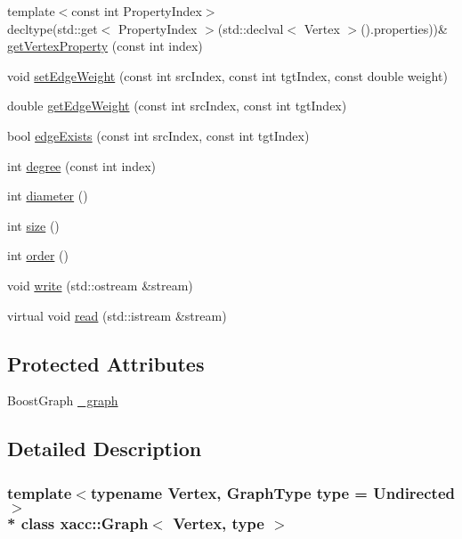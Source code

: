 \begin{DoxyCompactItemize}
\item 
{\footnotesize template$<$const int Property\+Index$>$ }\\decltype(std\+::get$<$ Property\+Index $>$(std\+::declval$<$ Vertex $>$().properties))\& \hyperlink{a00035_a394f58c21a234393f08b4c3a565a5940}{get\+Vertex\+Property} (const int index)
\item 
void \hyperlink{a00035_aaf1edd0f038f6cca1c3c9ece35d3ec05}{set\+Edge\+Weight} (const int src\+Index, const int tgt\+Index, const double weight)
\item 
double \hyperlink{a00035_a917e439598a91ace852ad67bba029f5c}{get\+Edge\+Weight} (const int src\+Index, const int tgt\+Index)
\item 
bool \hyperlink{a00035_acb5a6e586e58dbef53d84631134a1cdf}{edge\+Exists} (const int src\+Index, const int tgt\+Index)
\item 
int \hyperlink{a00035_afd0f6cc800e0d81f8c168d47c927cf02}{degree} (const int index)
\item 
int \hyperlink{a00035_a9da48591a9d5ec658ae8c62204821ea7}{diameter} ()
\item 
int \hyperlink{a00035_ae3138d390f1d1c7d335144b59df2ddac}{size} ()
\item 
int \hyperlink{a00035_a50fca47e555122b5bb72e93e719484b4}{order} ()
\item 
void \hyperlink{a00035_a56dbba0529135ffdebb4ac3fbdb69252}{write} (std\+::ostream \&stream)
\item 
virtual void \hyperlink{a00035_abdd3e67dc08c223821d809bc8914164a}{read} (std\+::istream \&stream)
\end{DoxyCompactItemize}
\subsection*{Protected Attributes}
\begin{DoxyCompactItemize}
\item 
Boost\+Graph \hyperlink{a00035_acc3a072e3a30cdb8107b571170d96694}{\+\_\+graph}
\end{DoxyCompactItemize}


\subsection{Detailed Description}
\subsubsection*{template$<$typename Vertex, Graph\+Type type = Undirected$>$\\*
class xacc\+::\+Graph$<$ Vertex, type $>$}


